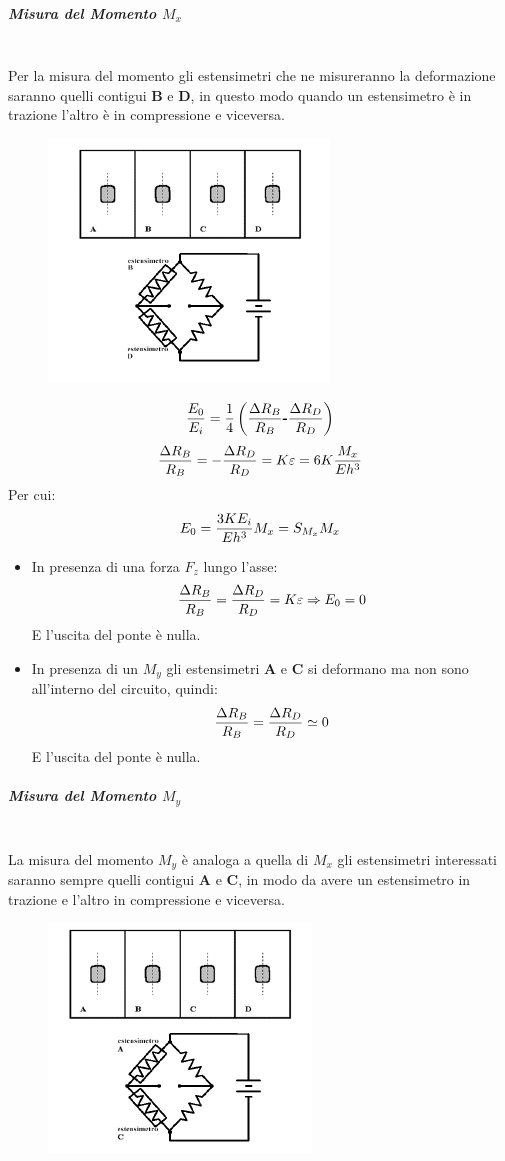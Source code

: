 \documentclass[a4paper, 15pt]{article}
\begin{document}
\begin{adjustwidth}{2in}{}
\begin{itemize}
  		\end{itemize}
\newpage  	
\subparagraph{Misura del Momento $M_x$}\mbox{} \\
  		Per la misura del momento gli estensimetri che ne misureranno la deformazione saranno quelli contigui \textbf{B} e \textbf{D}, in questo modo quando un estensimetro è in trazione l'altro è in compressione e viceversa. 
\begin{figure}[H]
	\centering
	\includegraphics[width=0.4\linewidth]{immagini/screenshot010}
	\label{fig:screenshot010}
\end{figure}
  		\[{E_0\over E_i} = {1\over4}\left({\Delta R_B\over R_B} \textbf{-} {\Delta R_D\over R_D}\right)\]  		
  		\[{\Delta R_B\over R_B} = -{\Delta R_D\over R_D} = K\varepsilon = 6K{M_x\over Eh^3}\]
  		Per cui:
  		\[E_0 = {3KE_i\over Eh^3}M_x = S_{M_x}M_x \] 		
  		\begin{itemize}
  			\item In presenza di una forza $F_z$ lungo l'asse: \[{\Delta R_B\over R_B} = {\Delta R_D\over R_D} = K\varepsilon \Rightarrow E_0 = 0\] E l'uscita del ponte è nulla.
  			\item In presenza di un $M_y$ gli estensimetri \textbf{A} e \textbf{C} si deformano ma non sono all'interno del circuito, quindi:
  			\[{\Delta R_B\over R_B} = {\Delta R_D\over R_D}\simeq0\]
  			E l'uscita del ponte è nulla. 
  		\end{itemize}
\newpage 	
\subparagraph{Misura del Momento $M_y$}\mbox{} \\
  		La misura del momento $M_y$ è analoga a quella di $M_x$ gli estensimetri interessati saranno sempre quelli contigui \textbf{A} e \textbf{C}, in modo da avere un estensimetro in trazione e l'altro in compressione e viceversa.   		
  		\begin{figure}[H]
  			\centering
  			\includegraphics[width=0.4\linewidth]{immagini/screenshot011}

\end{figure}
\end{adjustwidth}
\end{document}

